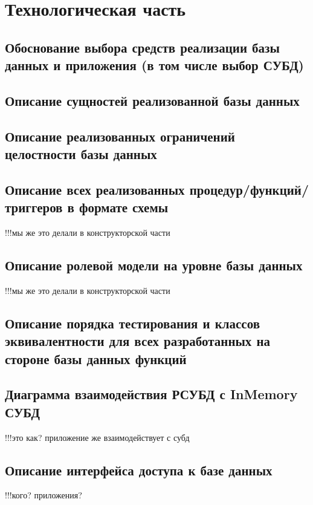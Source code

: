 \chapter{Технологическая часть}
\section{Обоснование выбора средств реализации базы данных и приложения (в том числе выбор СУБД)}


\section{Описание сущностей реализованной базы данных}

\section{Описание реализованных ограничений целостности базы данных}

\section{Описание всех реализованных процедур/функций/триггеров в формате схемы}
!!!мы же это делали в конструкторской части

\section{Описание ролевой модели на уровне базы данных}
!!!мы же это делали в конструкторской части

\section{Описание порядка тестирования и классов эквивалентности для всех разработанных на стороне базы данных функций}

\section{Диаграмма взаимодействия РСУБД с InMemory СУБД}
!!!это как? приложение же взаимодействует с субд

\section{Описание интерфейса доступа к базе данных}
!!!кого? приложения?

\clearpage
